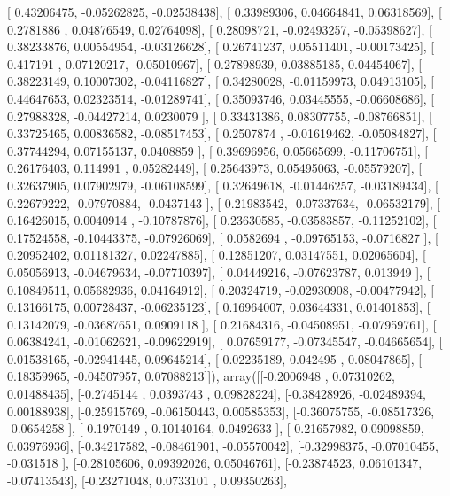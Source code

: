\documentclass{article}
\begin{document}
       [ 0.43206475, -0.05262825, -0.02538438],
       [ 0.33989306,  0.04664841,  0.06318569],
       [ 0.2781886 ,  0.04876549,  0.02764098],
       [ 0.28098721, -0.02493257, -0.05398627],
       [ 0.38233876,  0.00554954, -0.03126628],
       [ 0.26741237,  0.05511401, -0.00173425],
       [ 0.417191  ,  0.07120217, -0.05010967],
       [ 0.27898939,  0.03885185,  0.04454067],
       [ 0.38223149,  0.10007302, -0.04116827],
       [ 0.34280028, -0.01159973,  0.04913105],
       [ 0.44647653,  0.02323514, -0.01289741],
       [ 0.35093746,  0.03445555, -0.06608686],
       [ 0.27988328, -0.04427214,  0.0230079 ],
       [ 0.33431386,  0.08307755, -0.08766851],
       [ 0.33725465,  0.00836582, -0.08517453],
       [ 0.2507874 , -0.01619462, -0.05084827],
       [ 0.37744294,  0.07155137,  0.0408859 ],
       [ 0.39696956,  0.05665699, -0.11706751],
       [ 0.26176403,  0.114991  ,  0.05282449],
       [ 0.25643973,  0.05495063, -0.05579207],
       [ 0.32637905,  0.07902979, -0.06108599],
       [ 0.32649618, -0.01446257, -0.03189434],
       [ 0.22679222, -0.07970884, -0.0437143 ],
       [ 0.21983542, -0.07337634, -0.06532179],
       [ 0.16426015,  0.0040914 , -0.10787876],
       [ 0.23630585, -0.03583857, -0.11252102],
       [ 0.17524558, -0.10443375, -0.07926069],
       [ 0.0582694 , -0.09765153, -0.0716827 ],
       [ 0.20952402,  0.01181327,  0.02247885],
       [ 0.12851207,  0.03147551,  0.02065604],
       [ 0.05056913, -0.04679634, -0.07710397],
       [ 0.04449216, -0.07623787,  0.013949  ],
       [ 0.10849511,  0.05682936,  0.04164912],
       [ 0.20324719, -0.02930908, -0.00477942],
       [ 0.13166175,  0.00728437, -0.06235123],
       [ 0.16964007,  0.03644331,  0.01401853],
       [ 0.13142079, -0.03687651,  0.0909118 ],
       [ 0.21684316, -0.04508951, -0.07959761],
       [ 0.06384241, -0.01062621, -0.09622919],
       [ 0.07659177, -0.07345547, -0.04665654],
       [ 0.01538165, -0.02941445,  0.09645214],
       [ 0.02235189,  0.042495  ,  0.08047865],
       [ 0.18359965, -0.04507957,  0.07088213]]), array([[-0.2006948 ,  0.07310262,  0.01488435],
       [-0.2745144 ,  0.0393743 ,  0.09828224],
       [-0.38428926, -0.02489394,  0.00188938],
       [-0.25915769, -0.06150443,  0.00585353],
       [-0.36075755, -0.08517326, -0.0654258 ],
       [-0.1970149 ,  0.10140164,  0.0492633 ],
       [-0.21657982,  0.09098859,  0.03976936],
       [-0.34217582, -0.08461901, -0.05570042],
       [-0.32998375, -0.07010455, -0.031518  ],
       [-0.28105606,  0.09392026,  0.05046761],
       [-0.23874523,  0.06101347, -0.07413543],
       [-0.23271048,  0.0733101 ,  0.09350263],
\end{document}
